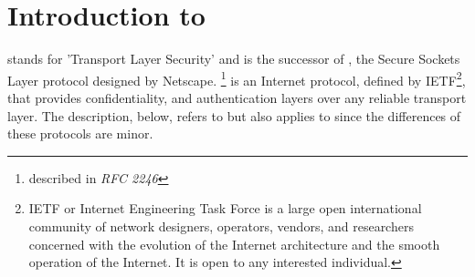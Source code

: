 \chapter{Introduction to \tls{}}

\label{sec:tlsintro}
\tls{} stands for 'Transport Layer Security' and is the successor of \ssl{}, 
the Secure Sockets Layer protocol designed by Netscape. 
\tlsI{}\footnote{described in {\it RFC 2246}\cite{RFC2246}} is an Internet protocol,
defined by {IETF}\footnote{IETF or Internet Engineering Task Force 
is a large open international community of network
designers, operators, vendors, and researchers concerned with the evolution of 
the Internet architecture and the smooth operation of the Internet. It is open 
to any interested individual.}, 
that provides confidentiality, and authentication layers over any reliable
transport layer. The description, below, refers to \tlsI{} but also
applies to \sslIII{} since the differences of these protocols are minor.












